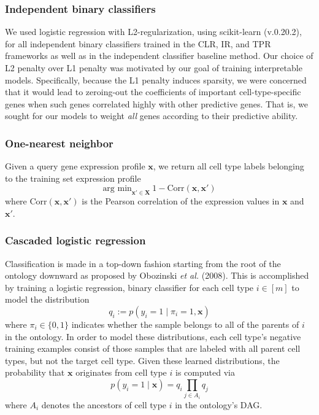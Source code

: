 \subsubsection*{Independent binary classifiers}

We used logistic regression with L2-regularization, using scikit-learn (v.0.20.2), for all independent binary classifiers trained in the CLR, IR, and TPR frameworks as well as in the independent classifier baseline method. Our choice of L2 penalty over L1 penalty was motivated by our goal of training interpretable models. Specifically, because the L1 penalty induces sparsity, we were concerned that it would lead to zeroing-out the coefficients of important cell-type-specific genes when such genes correlated highly with other predictive genes. That is, we sought for our models to weight \textit{all} genes according to their predictive ability. 


\subsubsection*{One-nearest neighbor}

Given a query gene expression profile $\boldsymbol{x}$, we return all cell type labels belonging to the training set expression profile
$$\text{arg min}_{\boldsymbol{x}' \in \boldsymbol{X}} \ 1 - \text{Corr}(\boldsymbol{x}, \boldsymbol{x}')$$
where $\text{Corr}(\boldsymbol{x},\boldsymbol{x}')$ is the Pearson correlation of the expression values in $\boldsymbol{x}$ and $\boldsymbol{x}'$.

\subsubsection*{Cascaded logistic regression}

Classification is made in a top-down fashion starting from the root of the ontology downward as proposed by Obozinski \textit{et al.} (2008). This is accomplished by training a logistic regression, binary classifier for each cell type $i \in [m]$ to model the distribution 
$$q_i := p(y_i = 1 \mid \pi_i=1, \boldsymbol{x})$$ 
where $\pi_i \in \{0, 1\}$ indicates whether the sample belongs to all of the parents of $i$ in the ontology. In order to model these distributions, each cell type's negative training examples consist of those samples that are labeled with all parent cell types, but not the target cell type. Given these learned distributions, the probability that $\boldsymbol{x}$ originates from cell type $i$ is computed via  
$$p(y_i = 1 \mid \boldsymbol{x}) = q_i \prod_{j \in A_i} q_j$$ 
where $A_i$ denotes the ancestors of cell type $i$ in the ontology's DAG. 

